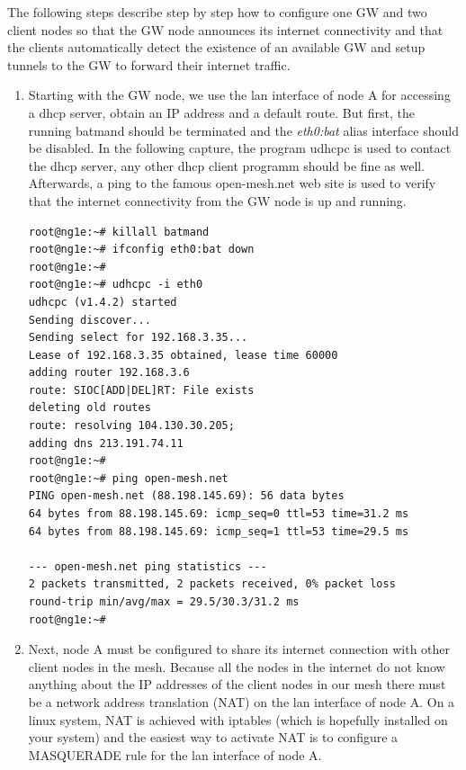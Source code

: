 \documentclass[11pt]{article}
\begin{document}
The following steps describe step by step how to configure one GW and two client nodes so that the GW node announces its internet connectivity and that the clients automatically detect the existence of an available GW and setup tunnels to the GW to forward their internet traffic.

\begin{enumerate}

\item Starting with the GW node, we use the lan interface of node A for accessing a dhcp server, obtain an IP address and a default route.
But first, the running batmand should be terminated and the \emph{eth0:bat} alias interface should be disabled.
In the following capture, the program udhcpc is used to contact the dhcp server, any other dhcp client programm should be fine as well.
Afterwards, a ping to the famous open-mesh.net web site is used to verify that the internet connectivity from the GW node is up and running.

\begin{small} \begin{verbatim}
root@ng1e:~# killall batmand
root@ng1e:~# ifconfig eth0:bat down
root@ng1e:~#
root@ng1e:~# udhcpc -i eth0
udhcpc (v1.4.2) started
Sending discover...
Sending select for 192.168.3.35...
Lease of 192.168.3.35 obtained, lease time 60000
adding router 192.168.3.6
route: SIOC[ADD|DEL]RT: File exists
deleting old routes
route: resolving 104.130.30.205;
adding dns 213.191.74.11
root@ng1e:~#
root@ng1e:~# ping open-mesh.net
PING open-mesh.net (88.198.145.69): 56 data bytes
64 bytes from 88.198.145.69: icmp_seq=0 ttl=53 time=31.2 ms
64 bytes from 88.198.145.69: icmp_seq=1 ttl=53 time=29.5 ms

--- open-mesh.net ping statistics ---
2 packets transmitted, 2 packets received, 0% packet loss
round-trip min/avg/max = 29.5/30.3/31.2 ms
root@ng1e:~#
\end{verbatim} \end{small}

\item Next, node A must be configured to share its internet connection with other client nodes in the mesh.
Because all the nodes in the internet do not know anything about the IP addresses of the client nodes in our mesh there must be a network address translation (NAT) on the lan interface of node A.
On a linux system, NAT is achieved with iptables (which is hopefully installed on your system) and the easiest way to activate NAT is to configure a MASQUERADE rule for the lan interface of node A.


\end{enumerate}
\end{document}
